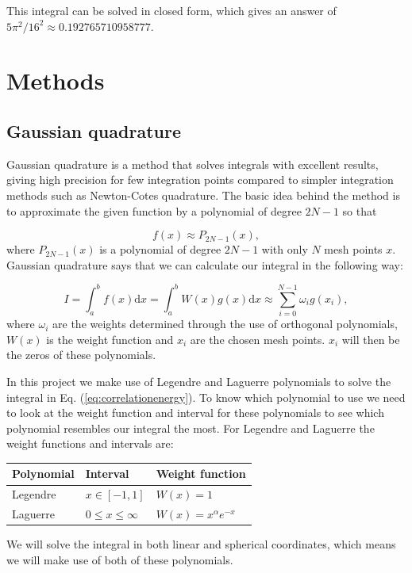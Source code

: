 \documentclass{article}
\begin{document}
\begin{multicols}{2}
This integral can be solved in closed form, which gives an answer of $5\pi^2/16^2 \approx 0.192765710958777$.



\section{Methods}

\subsection{Gaussian quadrature}
Gaussian quadrature is a method that solves integrals with excellent results, giving high precision for few integration points compared to simpler integration methods such as Newton-Cotes quadrature. The basic idea behind the method is to approximate the given function by a polynomial of degree $2N-1$ so that

\begin{equation*}
	f(x) \approx P_{2N-1} (x),
\end{equation*}
where $P_{2N-1} (x)$ is a polynomial of degree $2N-1$ with only $N$ mesh points $x$. Gaussian quadrature says that we can calculate our integral in the following way:

\begin{equation}
	I = \int_a^b f(x) \mathrm{d}x = \int_a^b W(x) g(x) \mathrm{d}x \approx \sum_{i = 0}^{N-1} \omega_i g(x_i),
\end{equation}
where $\omega_i$ are the weights determined through the use of orthogonal polynomials, $W(x)$ is the weight function and $x_i$ are the chosen mesh points. $x_i$ will then be the zeros of these polynomials.

In this project we make use of Legendre and Laguerre polynomials to solve the integral in Eq. (\ref{eq:correlationenergy}). To know which polynomial to use we need to look at the weight function and interval for these polynomials to see which polynomial resembles our integral the most. For Legendre and Laguerre the weight functions and intervals are:

\begin{center}
\begin{tabular}{ l l l }\hline
	Polynomial 					& Interval	 				& Weight function		\\ \hline
	Legendre 						& $ x \in [-1,1] $ 			& $W(x) = 1$		 \\
	Laguerre 						& $ 0 \leq x \leq \infty $		& $W(x) = x^{\alpha} e^{-x}$		 \\
	\hline
\end{tabular}
\end{center}
We will solve the integral in both linear and spherical coordinates, which means we will make use of both of these polynomials.


\end{multicols}
\end{document}
